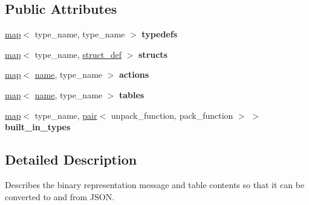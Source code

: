 \subsection*{Public Attributes}
\begin{DoxyCompactItemize}
\item 
\mbox{\label{structaacio_1_1chain_1_1contracts_1_1abi__serializer_ab80044dbbe38146684ad3e5f5361a933}} 
\mbox{\hyperlink{classstd_1_1map}{map}}$<$ type\+\_\+name, type\+\_\+name $>$ {\bfseries typedefs}
\item 
\mbox{\label{structaacio_1_1chain_1_1contracts_1_1abi__serializer_a4b63f47dd4d4ddd11d3f8d2bfc98748e}} 
\mbox{\hyperlink{classstd_1_1map}{map}}$<$ type\+\_\+name, \mbox{\hyperlink{structaacio_1_1chain_1_1contracts_1_1struct__def}{struct\+\_\+def}} $>$ {\bfseries structs}
\item 
\mbox{\label{structaacio_1_1chain_1_1contracts_1_1abi__serializer_a09af4164b37baf88ba909c50c7442e31}} 
\mbox{\hyperlink{classstd_1_1map}{map}}$<$ \mbox{\hyperlink{structaacio_1_1chain_1_1name}{name}}, type\+\_\+name $>$ {\bfseries actions}
\item 
\mbox{\label{structaacio_1_1chain_1_1contracts_1_1abi__serializer_ada7d848856cb16f6207d307af5bf6be8}} 
\mbox{\hyperlink{classstd_1_1map}{map}}$<$ \mbox{\hyperlink{structaacio_1_1chain_1_1name}{name}}, type\+\_\+name $>$ {\bfseries tables}
\item 
\mbox{\label{structaacio_1_1chain_1_1contracts_1_1abi__serializer_a50743c056846c04188174c82e5407fa8}} 
\mbox{\hyperlink{classstd_1_1map}{map}}$<$ type\+\_\+name, \mbox{\hyperlink{structpair}{pair}}$<$ unpack\+\_\+function, pack\+\_\+function $>$ $>$ {\bfseries built\+\_\+in\+\_\+types}
\end{DoxyCompactItemize}


\subsection{Detailed Description}
Describes the binary representation message and table contents so that it can be converted to and from J\+S\+ON. 

